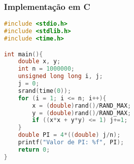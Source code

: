\documentclass[12pt]{article}
\begin{document}
\begin{center}
    



\end{center}

\begin{center}
    



\end{center}

\subsubsection{Implementação em C}
\begin{lstlisting}[language=C, caption=Pi via Monte Carlo em C]
#include <stdio.h>
#include <stdlib.h>
#include <time.h>

int main(){
    double x, y;
    int n = 1000000;
    unsigned long long i, j;
    j = 0;
    srand(time(0));
    for (i = 1; i <= n; i++){
        x = (double)rand()/RAND_MAX;
        y = (double)rand()/RAND_MAX;
        if ((x*x + y*y) <= 1) j+=1;
    }
    double PI = 4*((double) j/n);
    printf("Valor de PI: %f", PI);
    return 0;
}
\end{lstlisting}
\end{document}
